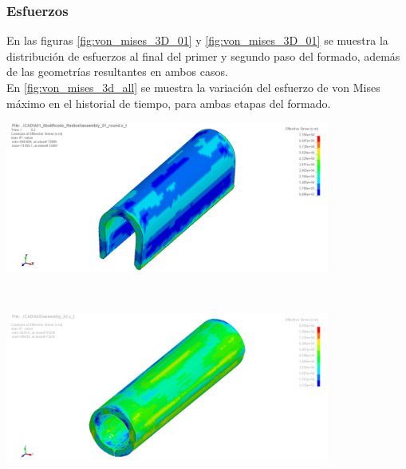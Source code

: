 \subsubsection{Esfuerzos}

En las figuras \ref{fig:von_mises_3D_01} y \ref{fig:von_mises_3D_01} se muestra la distribución 
de esfuerzos al final del primer y segundo paso del formado, además de las geometrías 
resultantes en ambos casos.\\

En \ref{fig:von_mises_3d_all} se muestra la variación del esfuerzo de von Mises máximo en 
el historial de tiempo, para ambas etapas del formado. \\

\begin{center}
\includegraphics[width=0.8\textwidth]{src/ch4/von_mises_3D_01.png}
\label{fig:von_mises_3D_01}
\end{center}

\hfill \\ [-2mm]

\begin{center}
\includegraphics[width=0.8\textwidth]{src/ch4/von_mises_3D_02.png}
\label{fig:von_mises_3D_02}
\end{center}

